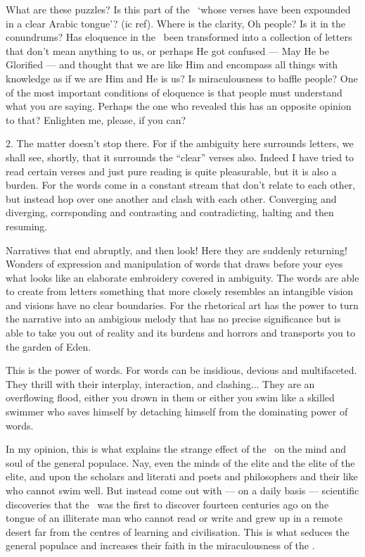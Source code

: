 \documentclass[12pt]{memoir}
\begin{document}
What are these puzzles?
Is this part of the \Quran\
‘whose verses have been expounded in a clear Arabic tongue’?
(\Quran{}ic ref).
Where is the clarity, Oh people?
Is it in the conundrums?
Has eloquence in the \Quran\ been transformed into a collection
of letters that don’t mean anything to us,
or perhaps He got confused — May He be Glorified —
and thought that we are like Him and encompass all things with knowledge
as if we are Him and He is us? Is miraculousness to baffle people?
One of the most important conditions of eloquence is
that people must understand what you are saying.
Perhaps the one who revealed this has an opposite opinion to that?
Enlighten me, please, if you can?

2. The matter doesn’t stop there. For if the ambiguity here surrounds letters,
we shall see, shortly, that it surrounds the “clear” verses also.
Indeed I have tried to read certain verses and just pure reading
is quite pleasurable, but it is also a burden.
For the words come in a constant stream that don’t relate to each other,
but instead hop over one another and clash with each other.
Converging and diverging, corrsponding and contrasting and contradicting,
halting and then resuming.

Narratives that end abruptly, and then look!
Here they are suddenly returning!
Wonders of expression and manipulation of words that draws before your eyes
what looks like an elaborate embroidery covered in ambiguity.
The words are able to create from letters something
that more closely resembles an intangible vision
and visions have no clear boundaries.
For the rhetorical art has the power to turn the narrative
into an ambigious melody that has no precise significance
but is able to take you out of reality and its burdens
and horrors and transports you to the garden of Eden.

This is the power of words.
For words can be insidious, devious and multi\–faceted.
They thrill with their interplay, interaction, and clashing...
They are an overflowing flood, either you drown in them
or either you swim like a skilled swimmer who saves himself
by detaching himself from the dominating power of words.

In my opinion, this is what explains the strange effect of the \Quran\
on the mind and soul of the general populace.
Nay, even the minds of the elite and the elite of the elite,
and upon the scholars and literati and poets
and philosophers and their like who cannot swim well.
But instead come out with — on a daily basis — scientific discoveries that
the \Quran\ was the first to discover fourteen centuries ago on the tongue
of an illiterate man who cannot read or write and grew up in a remote desert
far from the centres of learning and civilisation.
This is what seduces the general populace and increases
their faith in the miraculousness of the \Quran.
\end{document}
